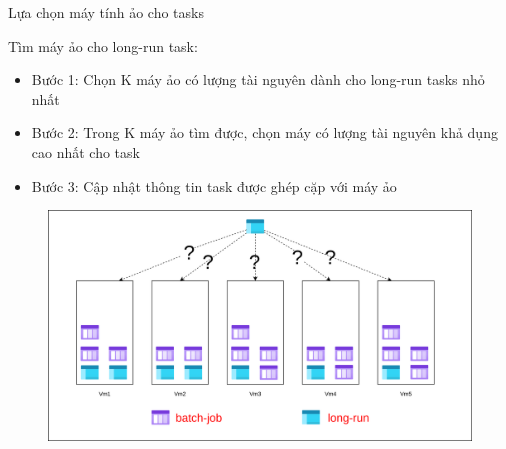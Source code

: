 \documentclass[11pt,xcolor={dvipsnames}, aspectratio=169]{beamer}
\begin{document}
\begin{frame}
{Lựa chọn máy tính ảo cho tasks}

	\begin{minipage}[t]{0.4\linewidth}
		\vspace{0.5cm}
		Tìm máy ảo cho long-run task: 
		\begin{itemize}
			\item Bước 1: Chọn K máy ảo có lượng tài nguyên dành cho long-run tasks nhỏ nhất 
			\item Bước 2: Trong K máy ảo tìm được, chọn máy có lượng tài nguyên khả dụng cao nhất cho task 
			\item Bước 3: Cập nhật thông tin task được ghép cặp với máy ảo
		\end{itemize}
	\end{minipage}
	\hfill
	\begin{minipage}[t]{0.59\linewidth}
	\begin{figure}
		\vspace{1cm}
		\includegraphics[scale=0.35]{images/balancing_tasks2.png}
	\end{figure}
	\vspace{1cm}
	\end{minipage}
\end{frame}
\end{document}
